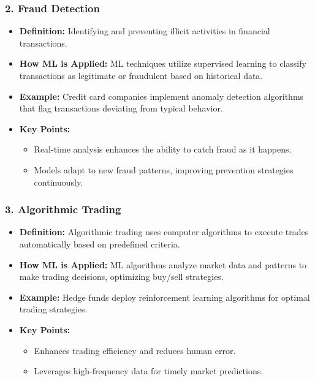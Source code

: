 \documentclass{beamer}
\begin{document}
\begin{frame}[fragile]
    \frametitle{2. Fraud Detection}
    \begin{itemize}
        \item \textbf{Definition:} Identifying and preventing illicit activities in financial transactions.
        
        \item \textbf{How ML is Applied:} 
        ML techniques utilize supervised learning to classify transactions as legitimate or fraudulent based on historical data.
        
        \item \textbf{Example:} Credit card companies implement anomaly detection algorithms that flag transactions deviating from typical behavior.
        
        \item \textbf{Key Points:}
        \begin{itemize}
            \item Real-time analysis enhances the ability to catch fraud as it happens.
            \item Models adapt to new fraud patterns, improving prevention strategies continuously.
        \end{itemize}
    \end{itemize}
\end{frame}

\begin{frame}[fragile]
    \frametitle{3. Algorithmic Trading}
    \begin{itemize}
        \item \textbf{Definition:} Algorithmic trading uses computer algorithms to execute trades automatically based on predefined criteria.
        
        \item \textbf{How ML is Applied:} 
        ML algorithms analyze market data and patterns to make trading decisions, optimizing buy/sell strategies.
        
        \item \textbf{Example:} Hedge funds deploy reinforcement learning algorithms for optimal trading strategies.
        
        \item \textbf{Key Points:}
        \begin{itemize}
            \item Enhances trading efficiency and reduces human error.
            \item Leverages high-frequency data for timely market predictions.
        \end{itemize}
    \end{itemize}
\end{frame}
\end{document}
